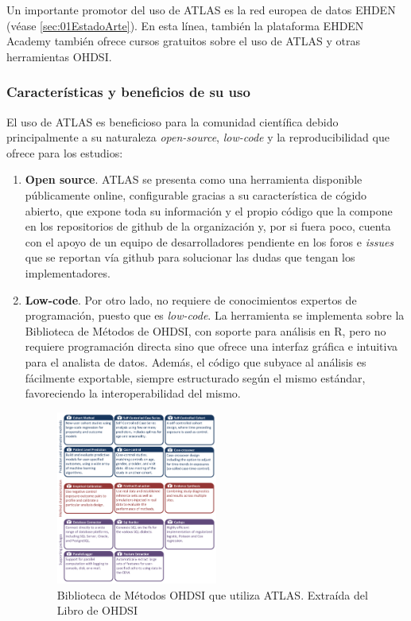 Un importante promotor del uso de ATLAS es la red europea de datos EHDEN \cite{ehden} (véase \ref{sec:01EstadoArte}). En esta línea, también la plataforma EHDEN Academy también ofrece cursos gratuitos sobre el uso de ATLAS y otras herramientas OHDSI.

\subsubsection{Características y beneficios de su uso}

El uso de ATLAS es beneficioso para la comunidad científica debido principalmente a su naturaleza \textit{open-source}, \textit{low-code} y la reproducibilidad que ofrece para los estudios:

\begin{enumerate}[label=\roman*.]

    \item \textbf{Open source}. ATLAS se presenta como una herramienta disponible públicamente online, configurable gracias a su característica de cógido abierto, que expone toda su información y el propio código que la compone en los repositorios de github de la organización y, por si fuera poco, cuenta con el apoyo de un equipo de desarrolladores pendiente en los foros e \textit{issues} que se reportan vía github para solucionar las dudas que tengan los implementadores. 

    \item \textbf{Low-code}. Por otro lado, no requiere de conocimientos expertos de programación, puesto que es \textit{low-code}. La herramienta se implementa sobre la Biblioteca de Métodos de OHDSI, con soporte para análisis en R, pero no requiere programación directa sino que ofrece una interfaz gráfica e intuitiva para el analista de datos. Además, el código que subyace al análisis es fácilmente exportable, siempre estructurado según el mismo estándar, favoreciendo la interoperabilidad del mismo.

\begin{figure}[H]
\centering
\includegraphics[width=0.50\textwidth]{figures/methodsLibrary.png}
\caption{Biblioteca de Métodos OHDSI que utiliza ATLAS. Extraída del Libro de OHDSI \cite{OHDSIbook}}
\label{fig:methodsLibrary}
\end{figure}
    

\end{enumerate}
